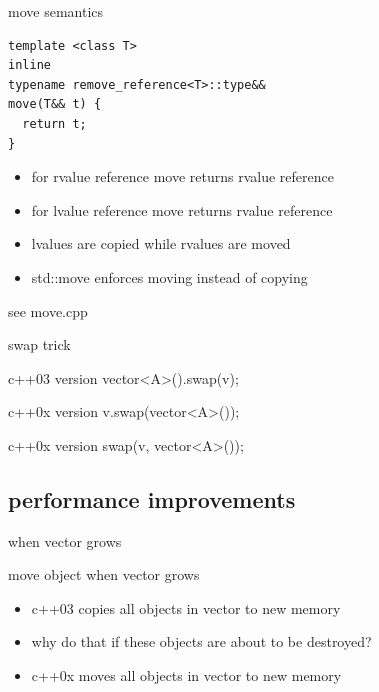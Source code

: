 \documentclass{beamer}
\begin{document}
\begin{frame}[fragile]{move semantics}
\begin{block}{}
\begin{verbatim}
template <class T>
inline
typename remove_reference<T>::type&&
move(T&& t) {
  return t;
}

\end{verbatim}
\end{block}
\begin{block}{}
  \begin{itemize}
  \item for rvalue reference move returns rvalue reference
  \item for lvalue reference move returns rvalue reference
  \item lvalues are copied while rvalues are moved
  \item std::move enforces moving instead of copying
  \end{itemize}
\end{block}
  see move.cpp
\end{frame}

\begin{frame}{swap trick}
  \begin{block}{c++03 version}
    vector<A>().swap(v);
  \end{block}

  \begin{block}{c++0x version}
    v.swap(vector<A>());
  \end{block}

  \begin{block}{c++0x version}
    swap(v, vector<A>());
  \end{block}
\end{frame}

\subsection{performance improvements}
\begin{frame}{when vector grows}
  \begin{block}{move object when vector grows}
    \begin{itemize}
    \item c++03 copies all objects in vector to new memory
    \item why do that if these objects are about to be destroyed?
    \item c++0x moves all objects in vector to new memory
    \end{itemize}
  \end{block}
\end{frame}
\end{document}
